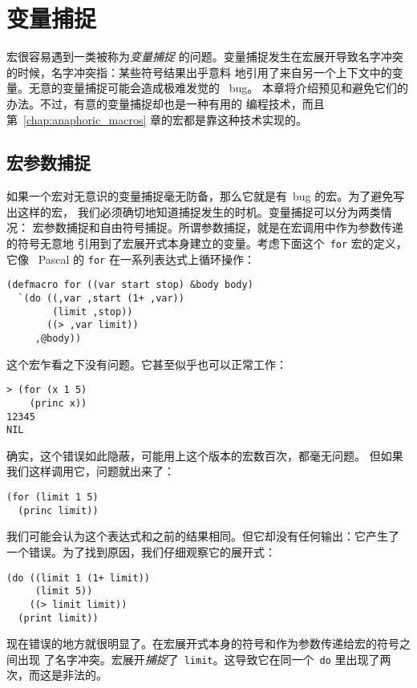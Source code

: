 
\chapter{变量捕捉}
\label{chap:variable_capture}

宏很容易遇到一类被称为\emph{变量捕捉}%
的问题。变量捕捉发生在宏展开导致名字冲突的时候，名字冲突指：某些符号结果出乎意料
地引用了来自另一个上下文中的变量。无意的变量捕捉可能会造成极难发觉的
~bug。
本章将介绍预见和避免它们的办法。不过，有意的变量捕捉却也是一种有用的
编程技术，而且第~\ref{chap:anaphoric_macros} 章的宏都是靠这种技术实现的。

\section{宏参数捕捉}
\label{sec:macro_argument_capture}

如果一个宏对无意识的变量捕捉毫无防备，那么它就是有~bug 的宏。为了避免写出这样的宏，
我们必须确切地知道捕捉发生的时机。变量捕捉可以分为两类情况：
宏参数捕捉和自由符号捕捉。所谓参数捕捉，就是在宏调用中作为参数传递的符号无意地
引用到了宏展开式本身建立的变量。考虑下面这个~\texttt{for} 宏的定义，它像
~Pascal 的 \texttt{for} 在一系列表达式上循环操作：
\begin{lstlisting}
(defmacro for ((var start stop) &body body)
  `(do ((,var ,start (1+ ,var))
        (limit ,stop))
       ((> ,var limit))
     ,@body))
\end{lstlisting}
这个宏乍看之下没有问题。它甚至似乎也可以正常工作：
\begin{lstlisting}
> (for (x 1 5)
    (princ x))
12345
NIL
\end{lstlisting}
确实，这个错误如此隐蔽，可能用上这个版本的宏数百次，都毫无问题。
但如果我们这样调用它，问题就出来了：
\begin{lstlisting}
(for (limit 1 5)
  (princ limit))
\end{lstlisting}
我们可能会认为这个表达式和之前的结果相同。但它却没有任何输出：它产生了
一个错误。为了找到原因，我们仔细观察它的展开式：
\begin{lstlisting}
(do ((limit 1 (1+ limit))
     (limit 5))
    ((> limit limit))
  (print limit))
\end{lstlisting}
现在错误的地方就很明显了。在宏展开式本身的符号和作为参数传递给宏的符号之间出现
了名字冲突。宏展开\emph{捕捉}了~\texttt{limit}。这导致它在同一个~\texttt{do}
里出现了两次，而这是非法的。

